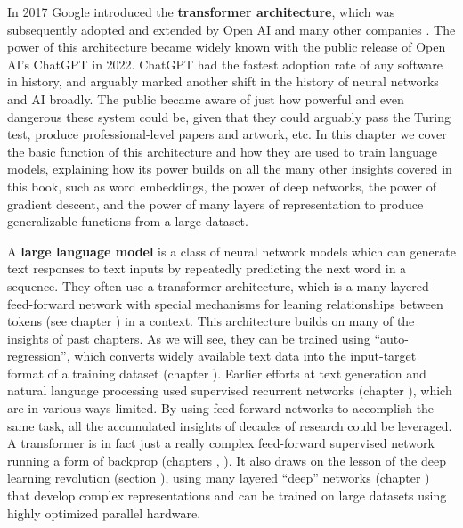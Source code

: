 In 2017 Google introduced the \textbf{transformer architecture}, which was subsequently adopted and extended by Open AI and many other companies \cite{vaswani2017attention}. The power of this architecture became widely known with the public release of Open AI's ChatGPT in 2022. ChatGPT had the fastest adoption rate of any software in history, and arguably marked another shift in the history of neural networks and AI broadly. The public became aware of just how powerful and even dangerous these system could be, given that they could arguably pass the Turing test, produce professional-level papers and artwork, etc. In this chapter we cover the basic function of this architecture and how they are used to train language models, explaining how its power builds on all the many other insights covered in this book, such as word embeddings, the power of deep networks, the power of gradient descent, and the power of many layers of representation to produce generalizable functions from a  large dataset.

A \textbf{large language model} is a class of neural network models which can generate text responses to text inputs by repeatedly predicting the next word in a sequence. They often use a transformer architecture, which is a many-layered feed-forward network with special mechanisms for leaning relationships between tokens (see chapter ) in a context. This architecture builds on many of the insights of past chapters. As we will see, they can be trained using ``auto-regression'', which converts widely available text data into the input-target format of a training dataset (chapter ). Earlier efforts at text generation and natural language processing used supervised recurrent networks (chapter ), which are in various ways limited. By using feed-forward networks to accomplish the same task, all the accumulated insights of decades of research could be leveraged. A transformer is in fact just a really complex feed-forward supervised network running a form of backprop (chapters , ). It also draws on the lesson of the deep learning revolution (section ), using many layered ``deep'' networks (chapter ) that develop complex representations and can be trained on large datasets using highly optimized parallel hardware.

